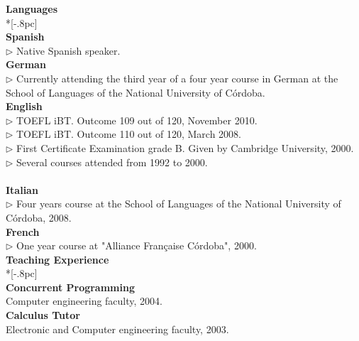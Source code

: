 \documentclass[letter,11pt,english]{article}
\begin{document}
{\large \bf Languages} \\*[-.8pc]
\underline{\hspace{6in}} \\
{\bf Spanish}\\
$\triangleright$ Native Spanish speaker.
\\
{\bf German}\\
$\triangleright$ Currently attending the third year of a four year course in German 
at the School of Languages of the National University of C\'ordoba.
 \\
{
{\bf English}\\
$\triangleright$ TOEFL iBT. Outcome 109 out of 120, November 2010.\\
$\triangleright$ TOEFL iBT. Outcome 110 out of 120, March 2008.\\
$\triangleright$ First Certificate Examination grade B. Given by Cambridge University, 2000.\\
$\triangleright$ Several courses attended from 1992 to 2000.\\
\\
{\bf Italian}\\
$\triangleright$ Four years course at the School of Languages of the National University of C\'ordoba, 2008.
\\
{\bf French}\\
$\triangleright$ One year course at "Alliance Fran\c caise C\'ordoba", 2000.
\\

{\large \bf Teaching Experience} \\*[-.8pc]
\underline{\hspace{6in}} \\
{\bf Concurrent Programming}\\
Computer engineering faculty, 2004.
\\
{\bf Calculus Tutor}\\
Electronic and Computer engineering faculty, 2003.
\\

}
\end{document}
